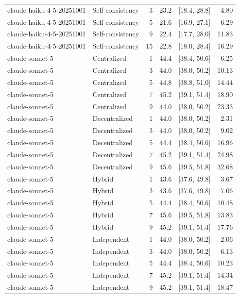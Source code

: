 \begin{tabular}{@{}llrrrr@{}}
claude-haiku-4-5-20251001 & Self-consistency & 3 & 23.2 & [18.4, 28.8] & 4.80 \\
claude-haiku-4-5-20251001 & Self-consistency & 5 & 21.6 & [16.9, 27.1] & 6.29 \\
claude-haiku-4-5-20251001 & Self-consistency & 9 & 22.4 & [17.7, 28.0] & 11.83 \\
claude-haiku-4-5-20251001 & Self-consistency & 15 & 22.8 & [18.0, 28.4] & 16.29 \\
claude-sonnet-5 & Centralized & 1 & 44.4 & [38.4, 50.6] & 6.25 \\
claude-sonnet-5 & Centralized & 3 & 44.0 & [38.0, 50.2] & 10.13 \\
claude-sonnet-5 & Centralized & 5 & 44.8 & [38.8, 51.0] & 14.44 \\
claude-sonnet-5 & Centralized & 7 & 45.2 & [39.1, 51.4] & 18.90 \\
claude-sonnet-5 & Centralized & 9 & 44.0 & [38.0, 50.2] & 23.33 \\
claude-sonnet-5 & Decentralized & 1 & 44.0 & [38.0, 50.2] & 2.31 \\
claude-sonnet-5 & Decentralized & 3 & 44.0 & [38.0, 50.2] & 9.02 \\
claude-sonnet-5 & Decentralized & 5 & 44.4 & [38.4, 50.6] & 16.96 \\
claude-sonnet-5 & Decentralized & 7 & 45.2 & [39.1, 51.4] & 24.98 \\
claude-sonnet-5 & Decentralized & 9 & 45.6 & [39.5, 51.8] & 32.68 \\
claude-sonnet-5 & Hybrid & 1 & 43.6 & [37.6, 49.8] & 3.67 \\
claude-sonnet-5 & Hybrid & 3 & 43.6 & [37.6, 49.8] & 7.06 \\
claude-sonnet-5 & Hybrid & 5 & 44.4 & [38.4, 50.6] & 10.48 \\
claude-sonnet-5 & Hybrid & 7 & 45.6 & [39.5, 51.8] & 13.83 \\
claude-sonnet-5 & Hybrid & 9 & 45.2 & [39.1, 51.4] & 17.76 \\
claude-sonnet-5 & Independent & 1 & 44.0 & [38.0, 50.2] & 2.06 \\
claude-sonnet-5 & Independent & 3 & 44.0 & [38.0, 50.2] & 6.13 \\
claude-sonnet-5 & Independent & 5 & 44.4 & [38.4, 50.6] & 10.23 \\
claude-sonnet-5 & Independent & 7 & 45.2 & [39.1, 51.4] & 14.34 \\
claude-sonnet-5 & Independent & 9 & 45.2 & [39.1, 51.4] & 18.47 \\

\end{tabular}
